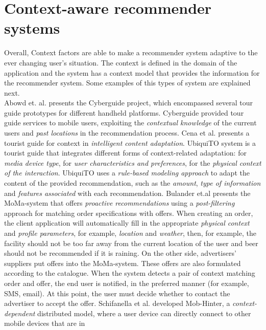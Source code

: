 \section{Context-aware recommender systems} 
Overall, Context factors are able to make a recommender system 
adaptive to the ever changing user's situation. The
context is defined in the domain of the application and the system has
a context model that provides the information for the recommender
system. Some  examples of this types of system are explained
next. \\
Abowd et. al.\cite{abowd1997cyberguide} presents the
Cyberguide project, which encompassed several tour 
guide prototypes for different handheld platforms. 
Cyberguide provided tour guide services to mobile users,
exploiting the \textit{contextual knowledge} of the current users and 
\textit{past locations} in the recommendation process. 
Cena et al.\cite{cena2006integrating} presents a tourist guide for
context in \textit{intelligent content adaptation}. UbiquiTO system is a
tourist guide that integrates different forms of context-related
adaptation: for \textit{media device type}, for \textit{user characteristics and
preferences}, for the \textit{physical context of the interaction}. UbiquiTO uses
a \textit{rule-based modeling approach} to adapt the content of the provided
recommendation, such as the \textit{amount}, \textit{type of information} and 
\textit{features associated} with each recommendation. 
Bulander et.al\cite{bulander2005comparison} presents the MoMa-system 
that offers \textit{proactive recommendations} using a \textit{post-filtering} 
approach for matching order specifications with offers. 
When creating an order, the client application will automatically fill in the 
appropriate \textit{physical context} and \textit{profile parameters}, for example, 
\textit{location} and \textit{weather}, then, for example, the facility should not be 
too far away from the current location of the user and beer should not be
recommended if it is raining. On the other side, advertisers'
suppliers put offers into the MoMa-system. These offers are also
formulated according to the catalogue. When the system detects a pair
of context matching order and offer, the end user is notified, in the
preferred manner (for example, SMS, email). At this point, the user
must decide whether to contact the advertiser to accept the offer.
Schifanella et al.\cite{schifanella2008mobhinter} developed
Mob-Hinter, a \textit{context-dependent} distributed model, where a user 
device can directly connect to other mobile devices that are in 
